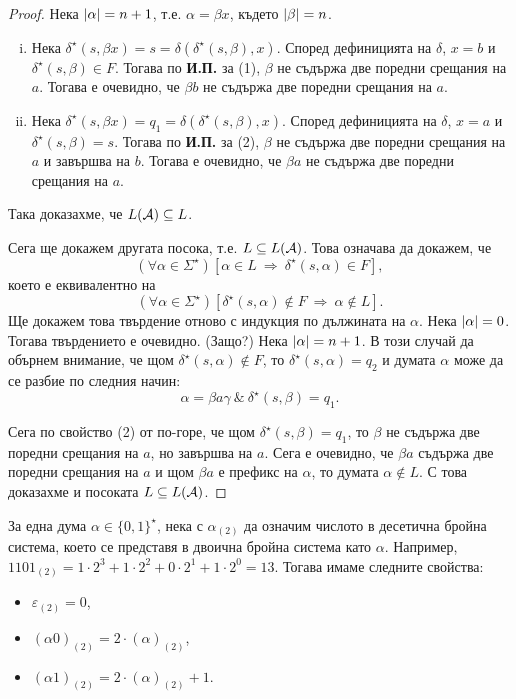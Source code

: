\begin{proof}
 Нека $\vert{\alpha}\vert = n+1$, т.е. $\alpha = \beta x$, където $\vert{\beta}\vert = n$.
 \begin{enumerate}[(i)]
 \item 
   Нека $\delta^\star(s,\beta x) = s = \delta(\delta^\star(s,\beta),x)$.
   Според дефиницията на $\delta$, $x = b$ и $\delta^\star(s,\beta) \in F$.
   Тогава по {\bf И.П.} за (1), $\beta$ не съдържа две поредни срещания на $a$.
   Тогава е очевидно, че $\beta b$ не  съдържа две поредни срещания на $a$.
 \item
   Нека $\delta^\star(s,\beta x) = q_1 = \delta(\delta^\star(s,\beta),x)$.
   Според дефиницията на $\delta$, $x = a$ и $\delta^\star(s,\beta) = s$.
   Тогава по {\bf И.П.} за (2), $\beta$ не съдържа две поредни срещания на $a$
   и завършва на $b$.
   Тогава е очевидно, че $\beta a$ не съдържа две поредни срещания на $a$.
 \end{enumerate}
 
 Така доказахме, че $L(\mathcal{A}) \subseteq L$.

 Сега ще докажем другата посока, т.е. $L \subseteq L(\mathcal{A})$.
 Това означава да докажем, че
 \[(\forall \alpha \in \Sigma^\star)[\alpha \in L\ \Rightarrow\ \delta^\star(s,\alpha) \in F],\]
 което е еквивалентно на
 \[(\forall \alpha \in \Sigma^\star)[\delta^\star(s,\alpha) \not\in F\ \Rightarrow\ \alpha\not\in L].\]
 Ще докажем това твърдение отново с индукция по дължината на $\alpha$.
 Нека $\vert{\alpha}\vert = 0$. Тогава твърдението е очевидно. (Защо?)
 Нека $\vert{\alpha}\vert = n+1$. В този случай 
 да обърнем внимание, че щом $\delta^\star(s,\alpha) \not\in F$, то
 $\delta^\star(s,\alpha) = q_2$ и думата $\alpha$ може да се разбие по следния начин:
 \[\alpha = \beta a \gamma\ \&\ \delta^\star(s,\beta) = q_1.\]
 
 Сега по свойство (2) от по-горе, че щом $\delta^\star(s,\beta) = q_1$, то
 $\beta$ не съдържа две поредни срещания на $a$, но завършва на $a$.
 Сега е очевидно, че $\beta a$ съдържа две поредни срещания на $a$ и 
 щом $\beta a$ е префикс на $\alpha$, то думата $\alpha \not\in L$.
 С това доказахме и посоката $L\subseteq L(\mathcal{A})$.
\end{proof}

\begin{framed}
  За една дума $\alpha \in \{0,1\}^\star$, 
  нека с $\alpha_{(2)}$ да означим числото в десетична бройна система, което се представя в двоична бройна система като $\alpha$.
  Например, $1101_{(2)} = 1 \cdot 2^3+1\cdot 2^2+0\cdot 2^1+1\cdot 2^0 = 13$.
  Тогава имаме следните свойства:
  \begin{itemize}
  \item
    $\varepsilon_{(2)} = 0$,
  \item
    $(\alpha0)_{(2)} = 2\cdot(\alpha)_{(2)}$,
  \item
    $(\alpha1)_{(2)} = 2\cdot(\alpha)_{(2)} + 1$.
  \end{itemize}
\end{framed}

